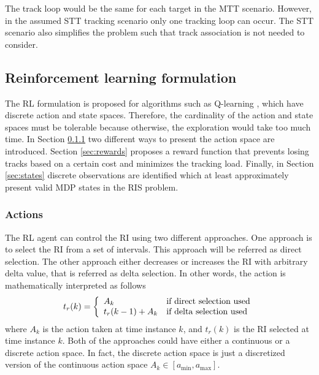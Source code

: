 \documentclass[english, 12pt, a4paper, elec, utf8, a-1b, online]{aaltothesis}
\newcommand{\ri}{t_r}
\begin{document}
The track loop would be the same for each target in the MTT scenario. 
However, in the assumed STT tracking scenario only one tracking loop can occur. 
The STT scenario also simplifies the problem such that track association is not needed to consider.


\subsection{Reinforcement learning formulation}\label{sec:RL_formulation}

The RL formulation is proposed for algorithms such as Q-learning \cite{Sutton2018}, which have discrete action and state spaces. 
Therefore, the cardinality of the action and state spaces must be tolerable because otherwise, the exploration would take too much time.
In Section \ref{sec:actions} two different ways to present the action space are introduced.
Section \ref{sec:rewards} proposes a reward function that prevents losing tracks based on a certain cost and minimizes the tracking load. 
Finally, in Section \ref{sec:states} discrete observations are identified which at least approximately present valid MDP states in the RIS problem.

\subsubsection{Actions} \label{sec:actions}

\newcommand{\amax}{a_\text{max}}
\newcommand{\amin}{a_\text{min}}

The RL agent can control the RI using two different approaches.
One approach is to select the RI from a set of intervals.
This approach will be referred as direct selection.
The other approach either decreases or increases the RI with arbitrary delta value, that is referred as delta selection.
In other words, the action is mathematically interpreted as follows
\begin{equation}
    \ri(k) = \left\{
        \begin{array}{l l}
            A_k & \text{if direct selection used} \\
            \ri(k-1) + A_k &  \text{if delta selection used}
        \end{array}\right.
\end{equation}
where $A_k$ is the action taken at time instance $k$, and $\ri(k)$ is the RI selected at time instance $k$.
Both of the approaches could have either a continuous or a discrete action space.
In fact, the discrete action space is just a discretized version of the continuous action space $A_k \in [\amin, \amax]$.
\end{document}
